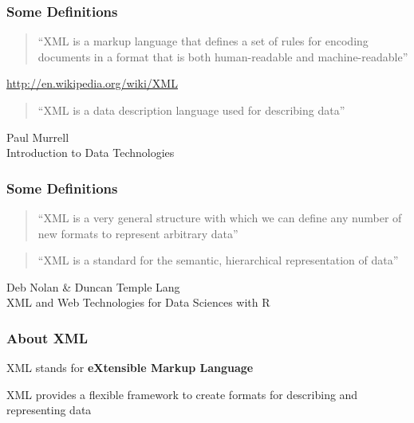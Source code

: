 \documentclass[12pt]{beamer}\usepackage[]{graphicx}\usepackage[]{color}
\begin{document}

\begin{frame}
\frametitle{Some Definitions}

\begin{quotation}
``XML is a markup language that defines a set of rules for encoding documents in a format that is both human-readable and machine-readable''
\end{quotation}

{\footnotesize 
\hspace{8mm} \url{http://en.wikipedia.org/wiki/XML}
}

\bigskip
\begin{quotation}
``XML is a data description language used for describing data''
\end{quotation}

{\footnotesize 
\hspace{8mm} {\hilit Paul Murrell} \\
\hspace{8mm} {\lolit Introduction to Data Technologies}
}

\end{frame}


\begin{frame}
\frametitle{Some Definitions}

\begin{quotation}
``XML is a very general structure with which we can define any number of new formats to represent arbitrary data''
\end{quotation}

\begin{quotation}
``XML is a standard for the semantic, hierarchical representation of data''
\end{quotation}

{\footnotesize 
\hspace{8mm} {\hilit Deb Nolan \& Duncan Temple Lang} \\
\hspace{8mm} {\lolit XML and Web Technologies for Data Sciences with R}
}

\end{frame}


\begin{frame}
\frametitle{About XML}

XML stands for \textbf{eXtensible Markup Language}
\eb

XML provides a flexible framework to create formats for describing and representing data
\eb

\end{frame}
\end{document}
